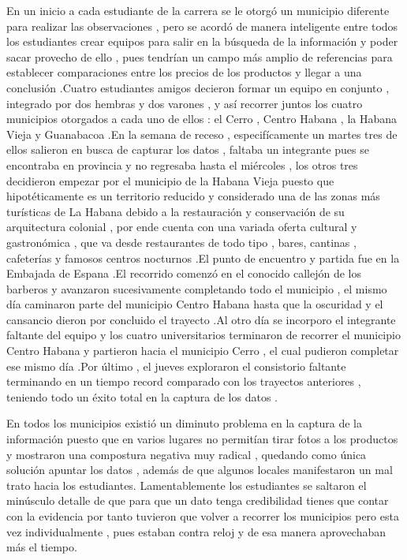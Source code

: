 \documentclass[twocolumn,12pt]{article}
\begin{document}
En un inicio a cada estudiante de la carrera se le otorgó un municipio diferente para realizar las observaciones , pero se acordó de manera inteligente entre todos los estudiantes crear equipos para salir en la búsqueda de la información y poder sacar provecho de ello , pues tendrían un campo más amplio de referencias para establecer comparaciones entre los precios de los productos y llegar a una conclusión .Cuatro estudiantes amigos decieron formar un equipo en conjunto , integrado por dos hembras y dos varones , y así recorrer juntos los cuatro municipios otorgados a cada uno de ellos : el Cerro , Centro Habana , la Habana Vieja y Guanabacoa .En la semana de receso , especifícamente un martes tres de ellos salieron en busca de capturar los datos , faltaba un integrante pues se encontraba en provincia y no regresaba hasta el miércoles , los otros tres decidieron empezar por el municipio de la Habana Vieja puesto que hipotéticamente es un territorio reducido y considerado una de las zonas más turísticas de La Habana  debido a la restauración y conservación de su arquitectura colonial , por ende cuenta con una variada oferta cultural y gastronómica , que va desde restaurantes de todo tipo , bares, cantinas , cafeterías y famosos centros nocturnos .El punto de encuentro y partida fue en la Embajada de Espana .El recorrido comenzó en el conocido callejón de los barberos y avanzaron sucesivamente completando todo el municipio , el mismo día caminaron parte del municipio Centro Habana hasta que la oscuridad y el cansancio dieron por concluido el trayecto .Al otro día se incorporo el integrante faltante del equipo y los cuatro universitarios terminaron de recorrer el municipio Centro Habana y partieron hacia el municipio Cerro , el cual pudieron completar ese mismo día .Por último , el jueves exploraron  el consistorio faltante terminando en un tiempo record comparado con los trayectos anteriores , teniendo todo un éxito total en la captura de los datos .

En todos los municipios existió un diminuto problema en la captura de la información puesto que en varios lugares no permitían tirar fotos a los productos  y mostraron una compostura negativa muy radical , quedando como única solución apuntar los datos , además de que algunos locales manifestaron un mal trato hacia los estudiantes.
Lamentablemente los estudiantes se saltaron el minúsculo detalle de que para que un dato tenga credibilidad tienes que contar con la evidencia por tanto tuvieron que volver a recorrer los municipios pero esta vez individualmente , pues estaban contra reloj y de esa manera aprovechaban más el tiempo.
\end{document}
